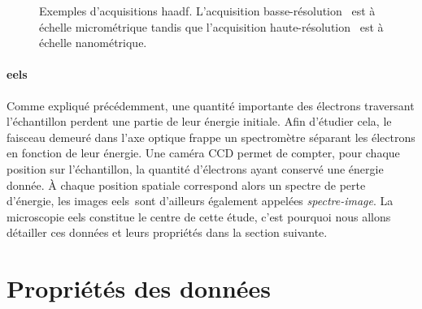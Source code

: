     \begin{figure}%
    	\centering
        \hspace{1em}
        \caption{\protect\label{fig-chap2-haadf-ex}Exemples d'acquisitions \gls{haadf}. L'acquisition basse-résolution~\protect{} est à échelle micrométrique  tandis que l'acquisition haute-résolution~\protect{} est à échelle nanométrique.}
     \end{figure}


    \paragraph*{\gls{eels}} Comme expliqué précédemment, une quantité importante des électrons traversant l'échantillon  perdent une partie de leur énergie initiale. Afin d'étudier cela, le faisceau demeuré dans l'axe optique frappe un spectromètre séparant les électrons en fonction de leur énergie. Une caméra CCD permet de compter, pour chaque position sur l'échantillon, la quantité d'électrons ayant conservé une énergie donnée. \`A chaque position spatiale correspond alors un spectre de perte d'énergie, les images \gls{eels} sont d'ailleurs également appelées \emph{spectre-image}. La microscopie \gls{eels} constitue le centre de cette étude, c'est pourquoi nous allons détailler ces données et leurs propriétés dans la section suivante.


    \section{Propriétés des données }\label{sec-prop-eels}

